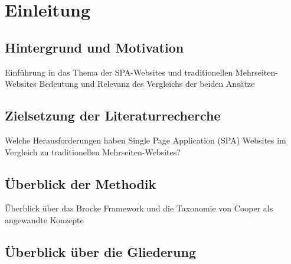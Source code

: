
\section{Einleitung}


\subsection{Hintergrund und Motivation}
Einführung in das Thema der SPA-Websites und traditionellen Mehrseiten-Websites
Bedeutung und Relevanz des Vergleichs der beiden Ansätze

\subsection{Zielsetzung der Literaturrecherche}
Welche Herausforderungen haben Single Page Application (SPA) Websites im Vergleich zu traditionellen Mehrseiten-Websites?

\subsection{Überblick der Methodik}
Überblick über das Brocke Framework und die Taxonomie von Cooper als angewandte Konzepte


\subsection{Überblick über die Gliederung}